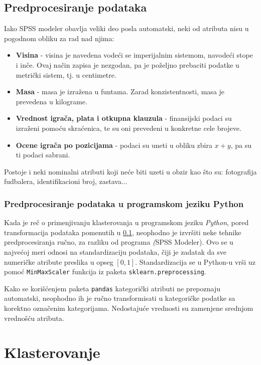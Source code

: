 \documentclass[a4paper]{article}
\begin{document}
\subsection{Predprocesiranje podataka}
\label{subsec:predprocesiranje}

Iako SPSS modeler obavlja veliki deo posla automatski, neki od atributa nisu u pogodnom obliku za rad nad njima:

\begin{itemize}
  \item{\textbf{Visina} - visina je navedena vodeći se imperijalnim sistemom, navodeći stope i inče. Ovaj način zapisa je nezgodan, pa je poželjno prebaciti podatke u metrički sistem, tj. u centimetre.}
  \item{\textbf{Masa} - masa je izražena u funtama. Zarad konzistentnosti, masa je prevedena u kilograme.}
  \item{\textbf{Vrednost igrača, plata i otkupna klauzula} - finansijski podaci su izraženi pomoću skraćenica, te su oni prevedeni u konkretne cele brojeve.}
  \item{\textbf{Ocene igrača po pozicijama} - podaci su uneti u obliku zbira $x+y$, pa su ti podaci sabrani.}
\end{itemize}

Postoje i neki nominalni atributi koji neće biti uzeti u obzir kao što su: fotografija fudbalera, identifikacioni broj, zastava...

\subsubsection{Predprocesiranje podataka u programskom jeziku Python}

Kada je reč o primenjivanju klasterovanja u programskom jeziku \textit{Python}, pored transformacija podataka pomenutih u \ref{subsec:predprocesiranje}, neophodno je izvršiti neke tehnike predprocesiranja ručno, za razliku od programa \textit(SPSS Modeler). Ovo se u najvećoj meri odnosi na standardizaciju podataka, čiji je zadatak da sve numeričke atribute preslika u opseg $[0, 1]$. Standardizacija se u Python-u vrši uz pomoć \texttt{MinMaxScaler} funkcija iz paketa \texttt{sklearn.preprocessing}.

Kako se korišćenjem paketa \texttt{pandas} kategorički atributi ne prepoznaju automatski, neophodno ih je ručno transformisati u kategoričke podatke sa korektno označenim kategorijama. Nedostajuće vrednosti su zamenjene srednjom vrednošću atributa.

\section{Klasterovanje}
\end{document}
